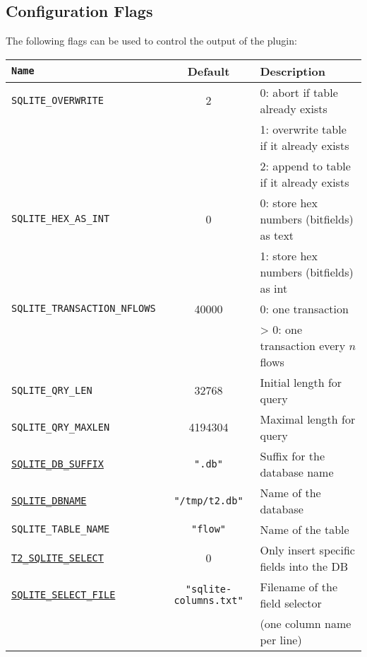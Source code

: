 \documentclass[documentation]{subfiles}
\begin{document}
\subsection{Configuration Flags}
The following flags can be used to control the output of the plugin:
\begin{longtable}{>{\tt}lcl}
    \toprule
    {\bf Name} & {\bf Default} & {\bf Description}\\
    \midrule\endhead%
    SQLITE\_OVERWRITE                              & 2                                & 0: abort if table already exists\\
                                                   &                                  & 1: overwrite table if it already exists\\
                                                   &                                  & 2: append to table if it already exists\\
    SQLITE\_HEX\_AS\_INT                           & 0                                & 0: store hex numbers (bitfields) as text\\
                                                   &                                  & 1: store hex numbers (bitfields) as int\\
    SQLITE\_TRANSACTION\_NFLOWS                    & 40000                            & 0: one transaction\\
                                                   &                                  & > 0: one transaction every $n$ flows\\
    SQLITE\_QRY\_LEN                               & 32768                            & Initial length for query\\
    SQLITE\_QRY\_MAXLEN                            & 4194304                          & Maximal length for query\\

    \hyperref[sqlite:dbname]{SQLITE\_DB\_SUFFIX}   & {\tt\small ".db"}                & Suffix for the database name\\
    \hyperref[sqlite:dbname]{SQLITE\_DBNAME}       & {\tt\small "/tmp/t2.db"}         & Name of the database\\
    SQLITE\_TABLE\_NAME                            & {\tt\small "flow"}               & Name of the table\\

    \hyperref[sqlite:select]{T2\_SQLITE\_SELECT}   & 0                                & Only insert specific fields into the DB\\
    \hyperref[sqlite:select]{SQLITE\_SELECT\_FILE} & {\tt\small "sqlite-columns.txt"} & Filename of the field selector\\
                                                   &                                  & (one column name per line)\\
    \bottomrule
\end{longtable}
\end{document}

